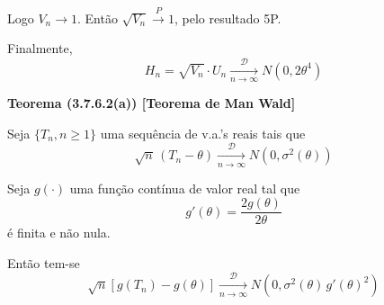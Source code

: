 Logo $V_n \to 1$. Então $\sqrt{V_n} \xrightarrow{P} 1$, pelo resultado 5P.

Finalmente,
\begin{equation}
H_n = \sqrt{V_n} \cdot U_n \xrightarrow[n \to \infty]{\mathcal{D}} N(0, 2\theta^4)
\end{equation}

\textbf{Teorema (3.7.6.2(a)) [Teorema de Man Wald]}

Seja $\{T_n, n \geq 1\}$ uma sequência de v.a.'s reais tais que
\begin{equation}
\sqrt{n} \, (T_n - \theta) \xrightarrow[n \to \infty]{\mathcal{D}} N\left(0, \sigma^2(\theta)\right)
\end{equation}

Seja $g(\cdot)$ uma função contínua de valor real tal que
\begin{equation}
g'(\theta) = \frac{2g(\theta)}{2\theta}
\end{equation}
é finita e não nula.

Então tem-se
\begin{equation}
\sqrt{n} \left[ g(T_n) - g(\theta) \right] \xrightarrow[n \to \infty]{\mathcal{D}} N\left(0, \sigma^2(\theta) \, g'(\theta)^2 \right)
\end{equation}